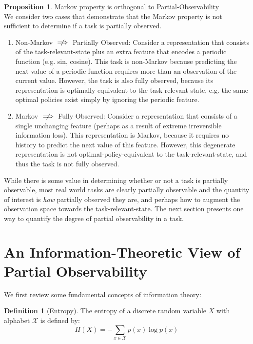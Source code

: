 \documentclass{article} %
\theoremstyle{definition}
\newtheorem{definition}{Definition}[section]
\newtheorem{prop}{Proposition}
\begin{document}
\begin{prop} Markov property is orthogonal to Partial-Observability\\
We consider two cases that demonstrate that the Markov property is not
sufficient to determine if a task is partially observed.
\begin{enumerate}
\item Non-Markov $\centernot\implies$ Partially Observed: Consider a
  representation that consists of the task-relevant-state plus an
  extra feature that encodes a periodic function (e.g. sin,
  cosine). This task is non-Markov because predicting the next value
  of a periodic function requires more than an observation of the
  current value. However, the task is also fully observed, because its
  representation is optimally equivalent to the task-relevant-state,
  e.g. the same optimal policies exist simply by ignoring the periodic
  feature.
\item Markov $\centernot\implies$ Fully Observed: Consider a representation
  that consists of a single unchanging feature (perhaps as a result of
  extreme irreversible information loss). This representation is
  Markov, because it requires no history to predict the next value of
  this feature. However, this degenerate representation is not
  optimal-policy-equivalent to the task-relevant-state, and thus the task
  is not fully observed.
\end{enumerate}
\end{prop}

While there is some value in determining whether or not a task is
partially observable, most real world tasks are clearly partially
observable and the quantity of interest is \textit{how} partially
observed they are, and perhaps how to augment the observation space
towards the task-relevant-state. The next section presents one way to
quantify the degree of partial observability in a task.

\section{An Information-Theoretic View of Partial Observability}
We first review some fundamental concepts of information theory:

\begin{definition}[Entropy]
\label{def:entropy}
The entropy of a discrete random variable $X$ with alphabet $\mathcal{X}$ is
defined by:
\[
H(X) = -\sum_{x\in \mathcal{X}} p(x) \log p(x)
\]
\end{definition}
\end{document}
